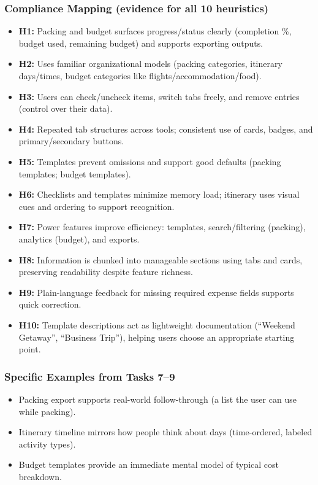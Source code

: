 \documentclass[11pt,a4paper]{article}
\begin{document}
\subsubsection{Compliance Mapping (evidence for all 10 heuristics)}
\begin{itemize}
    \item \textbf{H1:} Packing and budget surfaces progress/status clearly (completion \%, budget used, remaining budget) and supports exporting outputs.
    \item \textbf{H2:} Uses familiar organizational models (packing categories, itinerary days/times, budget categories like flights/accommodation/food).
    \item \textbf{H3:} Users can check/uncheck items, switch tabs freely, and remove entries (control over their data).
    \item \textbf{H4:} Repeated tab structures across tools; consistent use of cards, badges, and primary/secondary buttons.
    \item \textbf{H5:} Templates prevent omissions and support good defaults (packing templates; budget templates).
    \item \textbf{H6:} Checklists and templates minimize memory load; itinerary uses visual cues and ordering to support recognition.
    \item \textbf{H7:} Power features improve efficiency: templates, search/filtering (packing), analytics (budget), and exports.
    \item \textbf{H8:} Information is chunked into manageable sections using tabs and cards, preserving readability despite feature richness.
    \item \textbf{H9:} Plain-language feedback for missing required expense fields supports quick correction.
    \item \textbf{H10:} Template descriptions act as lightweight documentation (``Weekend Getaway'', ``Business Trip''), helping users choose an appropriate starting point.
\end{itemize}

\subsubsection{Specific Examples from Tasks 7--9}
\begin{itemize}
    \item Packing export supports real-world follow-through (a list the user can use while packing).
    \item Itinerary timeline mirrors how people think about days (time-ordered, labeled activity types).
    \item Budget templates provide an immediate mental model of typical cost breakdown.
\end{itemize}
\end{document}
